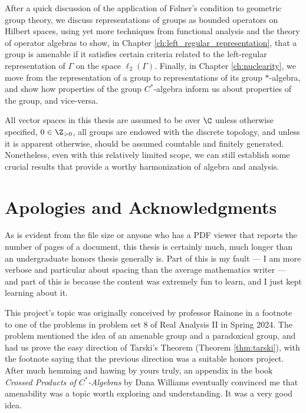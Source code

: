 \documentclass[11pt]{package2}
\renewcommand{\N}{\Z_{>0}}
\begin{document}
After a quick discussion of the application of Følner's condition to geometric group theory, we discuss representations of groups as bounded operators on Hilbert spaces, using yet more techniques from functional analysis and the theory of operator algebras to show, in Chapter \ref{ch:left_regular_representation}, that a group is amenable if it satisfies certain criteria related to the left-regular representation of $\Gamma$ on the space $\ell_2\left(\Gamma\right)$. Finally, in Chapter \ref{ch:nuclearity}, we move from the representation of a group to representations of its group $\ast$-algebra, and show how properties of the group $C^{\ast}$-algebra inform us about properties of the group, and vice-versa.\newline

All vector spaces in this thesis are assumed to be over $\C$ unless otherwise specified, $0\in\N$, all groups are endowed with the discrete topology, and unless it is apparent otherwise, should be assumed countable and finitely generated. Nonetheless, even with this relatively limited scope, we can still establish some crucial results that provide a worthy harmonization of algebra and analysis.
\section{Apologies and Acknowledgments}%
As is evident from the file size or anyone who has a PDF viewer that reports the number of pages of a document, this thesis is certainly much, much longer than an undergraduate honors thesis generally is. Part of this is my fault --- I am more verbose and particular about spacing than the average mathematics writer --- and part of this is because the content was extremely fun to learn, and I just kept learning about it.\newline

This project's topic was originally conceived by professor Rainone in a footnote to one of the problems in problem set 8 of Real Analysis II in Spring 2024. The problem mentioned the idea of an amenable group and a paradoxical group, and had us prove the easy direction of Tarski's Theorem (Theorem \ref{thm:tarski}), with the footnote saying that the previous direction was a suitable honors project. After much hemming and hawing by yours truly, an appendix in the book \textit{Crossed Products of $C^{\ast}$-Algebras} by Dana Williams eventually convinced me that amenability was a topic worth exploring and understanding. It was a very good idea.\newline
\end{document}
